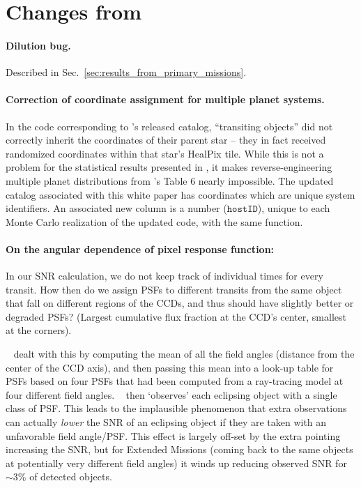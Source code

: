 \section{Changes from~\protect\citet{Sullivan_2015}}
\label{sec:changes_from_S15}
\paragraph{Dilution bug.}
Described in Sec.~\ref{sec:results_from_primary_missions}.

\paragraph{Correction of coordinate assignment for multiple planet systems.}
In the code corresponding to 's released catalog,
``transiting objects'' did not correctly inherit the coordinates of their 
parent star -- they in fact received randomized coordinates within that star's 
HealPix tile.
While this is not a problem for the statistical results presented in 
, it makes reverse-engineering multiple planet 
distributions from 's Table 6 nearly impossible.
The updated catalog associated with this white paper has coordinates which are 
unique system identifiers. An associated new column is a number 
($\mathtt{hostID}$), unique to each Monte Carlo realization of the updated 
code, with the same function.

\paragraph{On the angular dependence of \tesss pixel response function:} 
In our SNR calculation, we do not keep track of individual times for every transit. 
How then do we assign PSFs to different transits from the same object that fall on different regions of the CCDs, and thus should have slightly better or degraded PSFs? (Largest cumulative flux fraction at the CCD's center, smallest at the corners). 

~ dealt with this by computing the mean of all the field angles (distance from the center of the CCD axis), and then passing this mean into a look-up table for PSFs based on four PSFs that had been computed from a ray-tracing model at four different field angles.
~ then `observes' each eclipsing object with a single class of PSF.
This leads to the implausible phenomenon that extra observations can actually \textit{lower} the SNR of an eclipsing object if they are taken with an unfavorable field angle/PSF. 
This effect is largely off-set by the extra pointing increasing the SNR, but for Extended Missions (coming back to the same objects at potentially very different field angles) it winds up reducing observed SNR for $\sim$3\% of detected objects.

